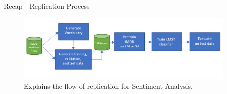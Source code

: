 \documentclass[aspectratio=169,xcolor=dvipsnames]{beamer}
\begin{document}
\begin{frame}{Recap - Replication Process}
    \begin{itemize}
    \newline
    \newline
         \begin{figure}
            \includegraphics[width=400]{replicationFlow2.PNG}
               \caption{Explains the flow of replication for Sentiment Analysis.}
        \end{figure}
        \newline
        \newline
         \break
    \end{itemize}
\end{frame}

\end{document}
